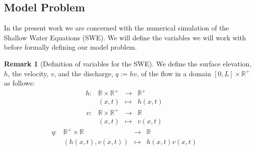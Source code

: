 \documentclass[12pt,a4paper]{article}
\numberwithin{equation}{section}
\theoremstyle{definition}
\newcommand{\R}{\mathbb{R}}
\newcommand{\dfunkmapsto}[5]{\ensuremath{
		\begin{array}{rccl}
			{#1}: & {#2} &\to&{#3}
			\\
			& {#4} &\mapsto&{#5}
		\end{array}\quad}}
\newcommand{\qp}[1]{\left(#1\right)}
\newcommand{\qb}[1]{\left[#1\right]}
\newtheorem{Rem}[subsection]{Remark}
\begin{document}
\subsection{Model Problem}
In the present work we are concerned with the numerical simulation of the Shallow Water Equations (SWE).  We will define the variables we will work with before formally defining our model problem.
\begin{Rem}[Definition of variables for the SWE]
We define the surface elevation,  $h$, the velocity, $v$, and the discharge, $q:=hv$, of the flow in a domain $\qb{0,L}\times\R^+$ as follows:
\begin{equation}\label{eq_defn_SWE_height}
\dfunkmapsto{h}{\mathbb{R}\times\mathbb{R}^+}{\mathbb{R}^+}{\qp{x,t}}{h\qp{x,t}}
\end{equation}
\begin{equation}\label{eq_defn_SWE_velocity}
\dfunkmapsto{v}{\mathbb{R}\times\mathbb{R}^+}{\mathbb{R}}{\qp{x,t}}{v\qp{x,t}}
\end{equation}
\begin{equation}\label{eq_defn_SWE_discharge}
\dfunkmapsto{q}{\mathbb{R}^+\times\mathbb{R}}{\mathbb{R}}{\qp{h\qp{x,t},v\qp{x,t}}}{h\qp{x,t}v\qp{x,t}}
\end{equation}
\end{Rem}
\end{document}
